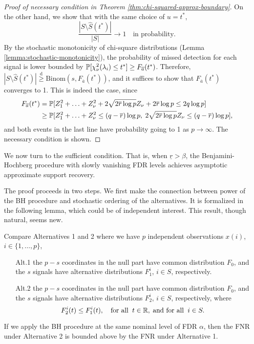 \begin{proof}[Proof of necessary condition in Theorem \ref{thm:chi-squared-approx-boundary}]
On the other hand, we show that with the same choice of $u = t^*$,
\begin{equation} \label{eq:approx-boundary-proof-converse-4}
    \frac{|{S}\setminus\widehat{S}(t^*)|}{|{S}|}\to 1 \quad \text{in probability}.
\end{equation}
By the stochastic monotonicity of chi-square distributions (Lemma \ref{lemma:stochastic-monotonicity}), the probability of missed detection for each signal is lower bounded by $\P[\chi^2_\nu(\lambda_i) \le t^*] \ge F_{\overline{a}}(t^*)$.
Therefore, $|{S}\setminus\widehat{S}(t^*)| \stackrel{\mathrm{d}}{\ge} \text{Binom}(s, {F_{\overline{a}}}(t^*))$, and it suffices to show that ${F_{\overline{a}}}(t^*)$ converges to 1.
This is indeed the case, since
\begin{align*}
    {F_{\overline{a}}}(t^*) 
    &= \P[Z_1^2 + \ldots + Z_\nu^2 + 2\sqrt{2\overline{r}\log{p}} Z_\nu + 2\overline{r}\log{p} \le 2q\log{p}] \\
    &\ge \P[Z_1^2 + \ldots + Z_\nu^2 \le (q-\overline{r})\log{p}, \; 2\sqrt{2\overline{r}\log{p}} Z_\nu \le (q-\overline{r})\log{p}],
\end{align*}
and both events in the last line have probability going to 1 as $p\to\infty$.
The necessary condition is shown.
\end{proof}

We now turn to the sufficient condition. 
That is, when $\underline{r} > \beta$, the Benjamini-Hochberg procedure with slowly vanishing FDR levels achieves asymptotic approximate support recovery.

The proof proceeds in two steps.
We first make the connection between power of the BH procedure and stochastic ordering of the alternatives.
It is formalized in the following lemma, which could be of independent interest.
This result, though natural, seems new. 

\begin{lemma} \label{lemma:monotonicity-BH-procedure}
Compare Alternatives 1 and 2 where we have $p$ independent observations $x(i)$, $i\in\{1,\ldots,p\}$,
\begin{enumerate}
    \item[Alt.1] the $p-s$ coordinates in the null part have common distribution $F_0$, and the $s$ signals have alternative distributions $F^{i}_1$, $i\in S$, respectively.
    \item[Alt.2] the $p-s$ coordinates in the null part have common distribution $F_0$, and the $s$ signals have alternative distributions $F^{i}_2$, $i\in S$, respectively, where
    $$ F^{i}_2(t) \le F^{i}_1(t), \quad \text{for all} \;\; t\in\R, \; \text{and for all} \;\; i\in S.$$
\end{enumerate}
If we apply the BH procedure at the same nominal level of FDR $\alpha$, then the FNR under Alternative 2 is bounded above by the FNR under Alternative 1.
\end{lemma}

